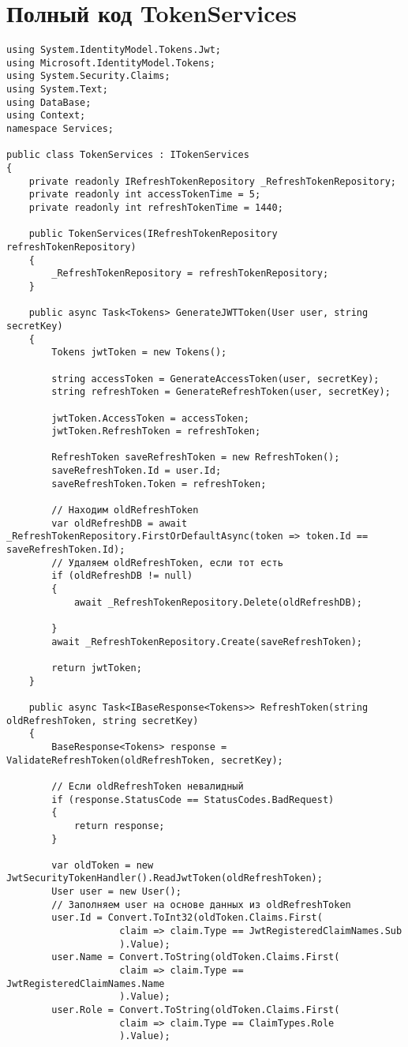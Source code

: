 \section{Полный код TokenServices}\label{app:TokenServices}
\begin{verbatim}
using System.IdentityModel.Tokens.Jwt;
using Microsoft.IdentityModel.Tokens;
using System.Security.Claims;
using System.Text;
using DataBase;
using Context;
namespace Services;

public class TokenServices : ITokenServices
{
    private readonly IRefreshTokenRepository _RefreshTokenRepository;
    private readonly int accessTokenTime = 5;
    private readonly int refreshTokenTime = 1440;

    public TokenServices(IRefreshTokenRepository refreshTokenRepository)
    {
        _RefreshTokenRepository = refreshTokenRepository;
    }

    public async Task<Tokens> GenerateJWTToken(User user, string secretKey)
    {
        Tokens jwtToken = new Tokens();

        string accessToken = GenerateAccessToken(user, secretKey);
        string refreshToken = GenerateRefreshToken(user, secretKey);

        jwtToken.AccessToken = accessToken;
        jwtToken.RefreshToken = refreshToken;

        RefreshToken saveRefreshToken = new RefreshToken();
        saveRefreshToken.Id = user.Id;
        saveRefreshToken.Token = refreshToken;

        // Находим oldRefreshToken
        var oldRefreshDB = await _RefreshTokenRepository.FirstOrDefaultAsync(token => token.Id == saveRefreshToken.Id);
        // Удаляем oldRefreshToken, если тот есть
        if (oldRefreshDB != null)
        {
            await _RefreshTokenRepository.Delete(oldRefreshDB);

        }
        await _RefreshTokenRepository.Create(saveRefreshToken);

        return jwtToken;
    }

    public async Task<IBaseResponse<Tokens>> RefreshToken(string oldRefreshToken, string secretKey)
    {
        BaseResponse<Tokens> response = ValidateRefreshToken(oldRefreshToken, secretKey);

        // Если oldRefreshToken невалидный
        if (response.StatusCode == StatusCodes.BadRequest)
        {
            return response;
        }

        var oldToken = new JwtSecurityTokenHandler().ReadJwtToken(oldRefreshToken);
        User user = new User();
        // Заполняем user на основе данных из oldRefreshToken
        user.Id = Convert.ToInt32(oldToken.Claims.First(
                    claim => claim.Type == JwtRegisteredClaimNames.Sub
                    ).Value);
        user.Name = Convert.ToString(oldToken.Claims.First(
                    claim => claim.Type == JwtRegisteredClaimNames.Name
                    ).Value);
        user.Role = Convert.ToString(oldToken.Claims.First(
                    claim => claim.Type == ClaimTypes.Role
                    ).Value);


\end{verbatim}
